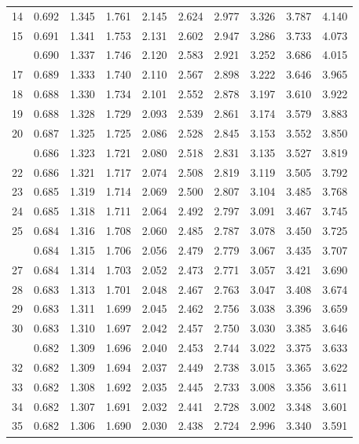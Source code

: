\documentclass[10pt]{article}
\begin{document}
\begin{center}
\begin{longtable}{@{}r!{\vrule width 0.8pt\hspace{0.65em}}rrrrrrrrr@{}}
14 & 0.692 & 1.345 & 1.761 & 2.145 & 2.624 & 2.977 & 3.326 & 3.787 & 4.140 \\
15 & 0.691 & 1.341 & 1.753 & 2.131 & 2.602 & 2.947 & 3.286 & 3.733 & 4.073 \\
 & 0.690 & 1.337 & 1.746 & 2.120 & 2.583 & 2.921 & 3.252 & 3.686 & 4.015 \\
17 & 0.689 & 1.333 & 1.740 & 2.110 & 2.567 & 2.898 & 3.222 & 3.646 & 3.965 \\
18 & 0.688 & 1.330 & 1.734 & 2.101 & 2.552 & 2.878 & 3.197 & 3.610 & 3.922 \\
19 & 0.688 & 1.328 & 1.729 & 2.093 & 2.539 & 2.861 & 3.174 & 3.579 & 3.883 \\
20 & 0.687 & 1.325 & 1.725 & 2.086 & 2.528 & 2.845 & 3.153 & 3.552 & 3.850 \\
 & 0.686 & 1.323 & 1.721 & 2.080 & 2.518 & 2.831 & 3.135 & 3.527 & 3.819 \\
22 & 0.686 & 1.321 & 1.717 & 2.074 & 2.508 & 2.819 & 3.119 & 3.505 & 3.792 \\
23 & 0.685 & 1.319 & 1.714 & 2.069 & 2.500 & 2.807 & 3.104 & 3.485 & 3.768 \\
24 & 0.685 & 1.318 & 1.711 & 2.064 & 2.492 & 2.797 & 3.091 & 3.467 & 3.745 \\
25 & 0.684 & 1.316 & 1.708 & 2.060 & 2.485 & 2.787 & 3.078 & 3.450 & 3.725 \\
 & 0.684 & 1.315 & 1.706 & 2.056 & 2.479 & 2.779 & 3.067 & 3.435 & 3.707 \\
27 & 0.684 & 1.314 & 1.703 & 2.052 & 2.473 & 2.771 & 3.057 & 3.421 & 3.690 \\
28 & 0.683 & 1.313 & 1.701 & 2.048 & 2.467 & 2.763 & 3.047 & 3.408 & 3.674 \\
29 & 0.683 & 1.311 & 1.699 & 2.045 & 2.462 & 2.756 & 3.038 & 3.396 & 3.659 \\
30 & 0.683 & 1.310 & 1.697 & 2.042 & 2.457 & 2.750 & 3.030 & 3.385 & 3.646 \\
 & 0.682 & 1.309 & 1.696 & 2.040 & 2.453 & 2.744 & 3.022 & 3.375 & 3.633 \\
32 & 0.682 & 1.309 & 1.694 & 2.037 & 2.449 & 2.738 & 3.015 & 3.365 & 3.622 \\
33 & 0.682 & 1.308 & 1.692 & 2.035 & 2.445 & 2.733 & 3.008 & 3.356 & 3.611 \\
34 & 0.682 & 1.307 & 1.691 & 2.032 & 2.441 & 2.728 & 3.002 & 3.348 & 3.601 \\
35 & 0.682 & 1.306 & 1.690 & 2.030 & 2.438 & 2.724 & 2.996 & 3.340 & 3.591 \\

\end{longtable}
\end{center}
\end{document}

